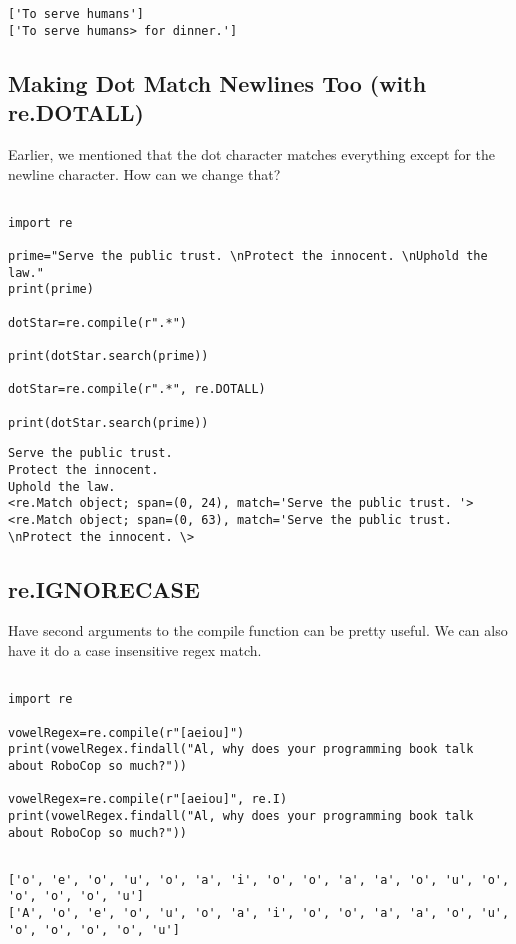 \documentclass[11pt]{article}
\begin{document}
\begin{verbatim}
['To serve humans']
['To serve humans> for dinner.']
\end{verbatim}

\subsection{Making Dot Match Newlines Too (with re.DOTALL)}
\label{sec:orgdf1de39}

Earlier, we mentioned that the dot character matches everything except for the newline character. How can we change that?

\begin{verbatim}

import re

prime="Serve the public trust. \nProtect the innocent. \nUphold the law."
print(prime)

dotStar=re.compile(r".*")

print(dotStar.search(prime))

dotStar=re.compile(r".*", re.DOTALL)

print(dotStar.search(prime))

\end{verbatim}

\begin{verbatim}
Serve the public trust. 
Protect the innocent. 
Uphold the law.
<re.Match object; span=(0, 24), match='Serve the public trust. '>
<re.Match object; span=(0, 63), match='Serve the public trust. \nProtect the innocent. \>
\end{verbatim}

\subsection{re.IGNORECASE}
\label{sec:orgee3827d}

Have second arguments to the compile function can be pretty useful. We can also have it do a case insensitive regex match.

\begin{verbatim}

import re

vowelRegex=re.compile(r"[aeiou]")
print(vowelRegex.findall("Al, why does your programming book talk about RoboCop so much?"))

vowelRegex=re.compile(r"[aeiou]", re.I)
print(vowelRegex.findall("Al, why does your programming book talk about RoboCop so much?"))


\end{verbatim}

\begin{verbatim}
['o', 'e', 'o', 'u', 'o', 'a', 'i', 'o', 'o', 'a', 'a', 'o', 'u', 'o', 'o', 'o', 'o', 'u']
['A', 'o', 'e', 'o', 'u', 'o', 'a', 'i', 'o', 'o', 'a', 'a', 'o', 'u', 'o', 'o', 'o', 'o', 'u']
\end{verbatim}
\end{document}
